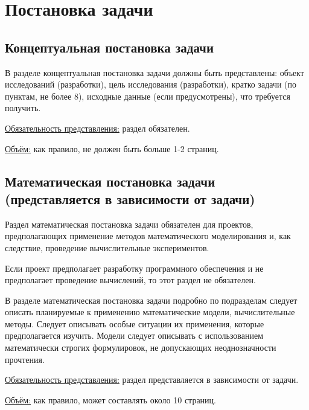 \chapter{Постановка задачи}
\section{Концептуальная постановка задачи}

В разделе концептуальная постановка задачи должны быть представлены: объект исследований (разработки), цель исследования (разработки), кратко задачи (по пунктам, не более 8), исходные данные (если предусмотрены), что требуется получить.

\underline{Обязательность представления:} раздел обязателен. 

\underline{Объём:} как правило, не должен быть больше 1-2 страниц.

\section{Математическая постановка задачи (представляется в зависимости от задачи)}

Раздел математическая постановка задачи обязателен для проектов, предполагающих применение методов математического моделирования и, как следствие, проведение вычислительные экспериментов.

Если проект предполагает разработку программного обеспечения и не предполагает проведение вычислений, то этот раздел не обязателен.

В разделе математическая постановка задачи подробно по подразделам следует описать планируемые к применению математические модели, вычислительные методы. Следует описывать особые ситуации их применения, которые предполагается изучить.
Модели следует описывать с использованием математически строгих формулировок, не допускающих неоднозначности прочтения.

\underline{Обязательность представления:} раздел представляется в зависимости от задачи. 

\underline{Объём:} как правило, может составлять около 10 страниц.

